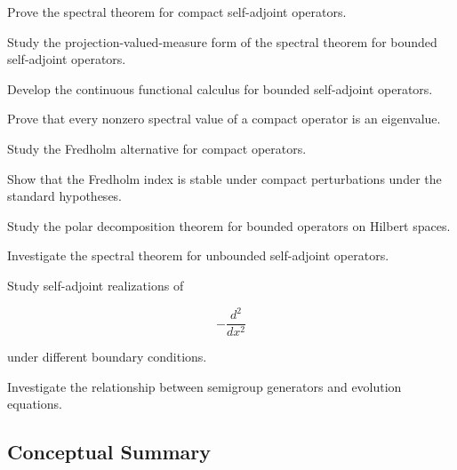 \begin{exercise}[4]
Prove the spectral theorem for compact self-adjoint operators.
\end{exercise}

\begin{exercise}[4]
Study the projection-valued-measure form of the spectral theorem for
bounded self-adjoint operators.
\end{exercise}

\begin{exercise}[4]
Develop the continuous functional calculus for bounded self-adjoint
operators.
\end{exercise}

\begin{exercise}[4]
Prove that every nonzero spectral value of a compact operator is an
eigenvalue.
\end{exercise}

\begin{exercise}[4]
Study the Fredholm alternative for compact operators.
\end{exercise}

\begin{exercise}[4]
Show that the Fredholm index is stable under compact perturbations under
the standard hypotheses.
\end{exercise}

\begin{exercise}[4]
Study the polar decomposition theorem for bounded operators on Hilbert
spaces.
\end{exercise}

\begin{exercise}[4]
Investigate the spectral theorem for unbounded self-adjoint operators.
\end{exercise}

\begin{exercise}[4]
Study self-adjoint realizations of

\[
-\frac{d^2}{dx^2}
\]

under different boundary conditions.
\end{exercise}

\begin{exercise}[4]
Investigate the relationship between semigroup generators and evolution
equations.
\end{exercise}

\subsection{Conceptual Summary}
\label{subsec:operator-theory-summary}

